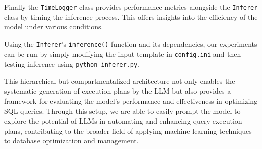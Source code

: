 Finally the \lstinline{TimeLogger} class provides performance metrics alongside the \lstinline{Inferer} class by timing the inference process. This offers insights into the efficiency of the model under various conditions.

Using the \lstinline{Inferer}'s \lstinline{inference()} function and its dependencies, our experiments can be run by simply modifying the input template in \lstinline{config.ini} and then testing inference using \lstinline{python inferer.py}.

This hierarchical but compartmentalized architecture not only enables the systematic generation of execution plans by the LLM but also provides a framework for evaluating the model's performance and effectiveness in optimizing SQL queries. Through this setup, we are able to easily prompt the model to explore the potential of LLMs in automating and enhancing query execution plans, contributing to the broader field of applying machine learning techniques to database optimization and management.

